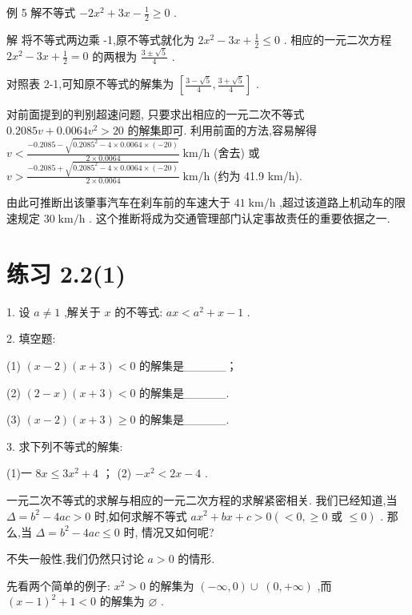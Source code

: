 \documentclass[10pt]{article}
\begin{document}
例 5 解不等式 \(- 2{x}^{2} + {3x} - \frac{1}{2} \geq  0\) .

解 将不等式两边乘 -1,原不等式就化为 \(2{x}^{2} - {3x} + \frac{1}{2} \leq  0\) . 相应的一元二次方程 \(2{x}^{2} - {3x} + \frac{1}{2} = 0\) 的两根为 \(\frac{3 \pm  \sqrt{5}}{4}\) .

对照表 2-1,可知原不等式的解集为 \(\left\lbrack  {\frac{3 - \sqrt{5}}{4},\frac{3 + \sqrt{5}}{4}}\right\rbrack\) .

对前面提到的判别超速问题, 只要求出相应的一元二次不等式 \({0.2085v} + {0.0064}{v}^{2} > {20}\) 的解集即可. 利用前面的方法,容易解得 \(v < \frac{-{0.2085} - \sqrt{{0.2085}^{2} - 4 \times  {0.0064} \times  \left( {-{20}}\right) }}{2 \times  {0.0064}}\mathrm{\;{km}}/\mathrm{h}\) (舍去) 或 \(v > \frac{-{0.2085} + \sqrt{{0.2085}^{2} - 4 \times  {0.0064} \times  \left( {-{20}}\right) }}{2 \times  {0.0064}}\mathrm{\;{km}}/\mathrm{h}\) (约为 41.9 km/h).

由此可推断出该肇事汽车在刹车前的车速大于 \({41}\mathrm{\;{km}}/\mathrm{h}\) ,超过该道路上机动车的限速规定 \({30}\mathrm{\;{km}}/\mathrm{h}\) . 这个推断将成为交通管理部门认定事故责任的重要依据之一.

\section*{练习 2.2(1)}

1. 设 \(a \neq  1\) ,解关于 \(x\) 的不等式: \({ax} < {a}^{2} + x - 1\) .

2. 填空题:

(1) \(\left( {x - 2}\right) \left( {x + 3}\right)  < 0\) 的解集是\_\_\_\_\_；

(2) \(\left( {2 - x}\right) \left( {x + 3}\right)  < 0\) 的解集是\_\_\_\_\_.

(3) \(\left( {x - 2}\right) \left( {x + 3}\right)  \geq  0\) 的解集是\_\_\_\_\_.

3. 求下列不等式的解集:

(1)一 \({8x} \leq  3{x}^{2} + 4\) ； (2) \(- {x}^{2} < {2x} - 4\) .



一元二次不等式的求解与相应的一元二次方程的求解紧密相关. 我们已经知道,当 \(\Delta  = {b}^{2} - {4ac} > 0\) 时,如何求解不等式 \(a{x}^{2} + {bx} + c > 0\left( { < 0, \geq  0\text{ 或 } \leq  0}\right)\) . 那么,当 \(\Delta  = {b}^{2} - {4ac} \leq  0\) 时, 情况又如何呢?

不失一般性,我们仍然只讨论 \(a > 0\) 的情形.

先看两个简单的例子: \({x}^{2} > 0\) 的解集为 \(\left( {-\infty ,0}\right)  \cup \; \left( {0, + \infty }\right)\) ,而 \({\left( x - 1\right) }^{2} + 1 < 0\) 的解集为 \(\varnothing\) .
\end{document}
